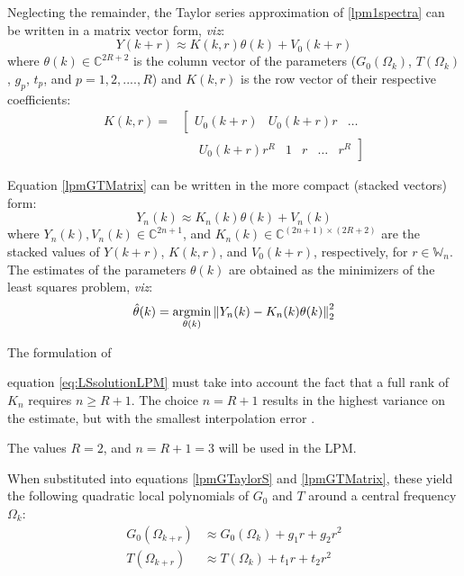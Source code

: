 Neglecting the remainder, the Taylor series approximation of \eqref{lpm1spectra} can be written in a matrix vector form, \emph{viz}:
\begin{equation}\label{lpmGTMatrix}
Y(k+r)\approx{K(k, r)\theta(k)+V_0(k+r)}
\end{equation}
where $\theta(k)\in\mathbb{C}^{2R+2}$ is the column vector of the  parameters ($G_0(\Omega_k)$, $T(\Omega_k)$, $g_p$, $t_p$, and $p = 1, 2, ...., R$) and $K(k, r)$ is the row vector of their respective coefficients:
\begin{align}
K(k,r) = &\left[
\begin{matrix}
U_0(k+r) & U_0(k+r)r & \dots 
\end{matrix}
\right.
\\ 
&\quad\left.\begin{matrix}U_0(k+r)r^R & 1& r&\dots&r^R\end{matrix}\right]\nonumber
\end{align}


Equation \eqref{lpmGTMatrix} can be written in the more compact (stacked vectors) form:
\begin{equation}\label{lpmGTMatrixStack}
Y_n(k)\approx K_n(k)\theta(k)+V_n(k)
\end{equation}
where $Y_n(k), V_n(k)\in\mathbb{C}^{2n+1}$, and $K_n(k)\in\mathbb{C}^{(2n+1)\times(2R+2)}$ are the stacked values of $Y(k+r)$, $K(k,r)$, and $V_0(k+r)$, respectively, for $r\in\mathbb{W}_n$.
The estimates of the parameters $\theta(k)$ are obtained as the minimizers of the least squares problem, \emph{viz}:
\begin{align}\label{eq:LSsolutionLPM}
\hat\theta(k) = \operatorname*{argmin}_{\theta(k)} \left\|Y_n(k) - K_n(k)\theta(k)\right\|_2^2
\end{align}

The formulation of


 equation \eqref{eq:LSsolutionLPM} must take into account the fact that  a full rank of $K_n$ requires $n \geq R + 1$. The choice $n = R + 1$ results in the highest variance on the estimate, but with the smallest interpolation error \cite{schoukens2010nonparametric}. %











The values $R = 2$, and $n=R+1=3$ will be used in the LPM.


When substituted into equations \eqref{lpmGTaylorS} and \eqref{lpmGTMatrix},
 these yield the following quadratic local polynomials of $G_0$ and $T$ around a central frequency $\Omega_{k}$:
\begin{align}\label{lpmImplQuadG}
G_0(\Omega_{k+r})&\approx G_0(\Omega_k)+g_1r+g_2r^2
\\
T(\Omega_{k+r})&\approx T(\Omega_k)+t_1r+t_2r^2\label{lpmImplQuadT}
\end{align}

